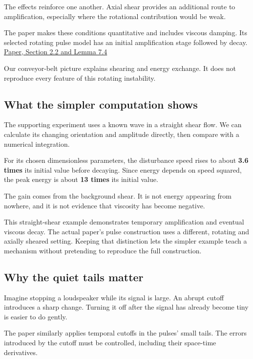 \documentclass[
  english,
  11pt,
]{article}
\begin{document}
The effects reinforce one another. Axial shear provides an additional
route to amplification, especially where the rotational contribution
would be weak.

The paper makes these conditions quantitative and includes viscous
damping. Its selected rotating pulse model has an initial amplification
stage followed by decay.
\href{https://cdn.openai.com/pdf/32d9f210-8b73-45e0-91bc-82a30aef8a9a/navier-stokes.pdf}{Paper,
Section 2.2 and Lemma 7.4}

Our conveyor-belt picture explains shearing and energy exchange. It does
not reproduce every feature of this rotating instability.

\subsection{What the simpler computation
shows}\label{what-the-simpler-computation-shows}

The supporting experiment uses a known wave in a straight shear flow. We
can calculate its changing orientation and amplitude directly, then
compare with a numerical integration.

For its chosen dimensionless parameters, the disturbance speed rises to
about \textbf{3.6 times} its initial value before decaying. Since energy
depends on speed squared, the peak energy is about \textbf{13 times} its
initial value.

The gain comes from the background shear. It is not energy appearing
from nowhere, and it is not evidence that viscosity has become negative.

This straight-shear example demonstrates temporary amplification and
eventual viscous decay. The actual paper's pulse construction uses a
different, rotating and axially sheared setting. Keeping that
distinction lets the simpler example teach a mechanism without
pretending to reproduce the full construction.

\subsection{Why the quiet tails
matter}\label{why-the-quiet-tails-matter}

Imagine stopping a loudspeaker while its signal is large. An abrupt
cutoff introduces a sharp change. Turning it off after the signal has
already become tiny is easier to do gently.

The paper similarly applies temporal cutoffs in the pulses' small tails.
The errors introduced by the cutoff must be controlled, including their
space-time derivatives.
\end{document}
